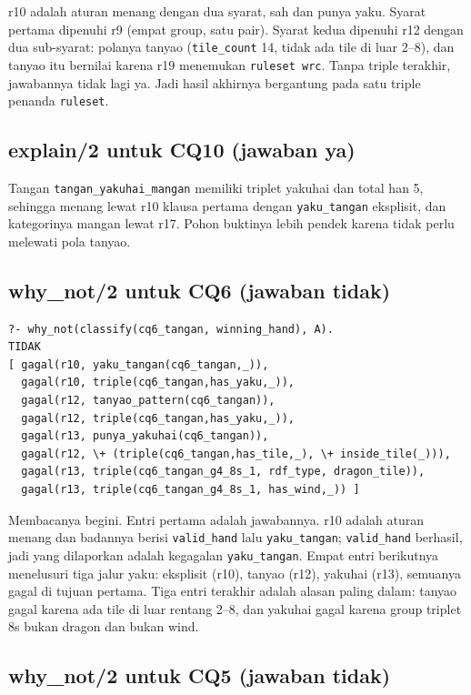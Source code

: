\documentclass[11pt,a4paper]{article}
\newcommand{\code}[1]{\texttt{#1}}
\begin{document}
r10 adalah aturan menang dengan dua syarat, sah dan punya yaku.
Syarat pertama dipenuhi r9 (empat group, satu pair). Syarat kedua dipenuhi r12 dengan
dua sub-syarat: polanya tanyao (\code{tile_count} 14, tidak ada tile di luar 2--8), dan
tanyao itu bernilai karena r19 menemukan \code{ruleset wrc}. Tanpa triple terakhir,
jawabannya tidak lagi ya. Jadi hasil akhirnya bergantung pada satu triple penanda \code{ruleset}.

\subsection{explain/2 untuk CQ10 (jawaban ya)}

Tangan \code{tangan_yakuhai_mangan} memiliki triplet yakuhai dan total han 5, sehingga
menang lewat r10 klausa pertama dengan \code{yaku_tangan} eksplisit, dan kategorinya mangan
lewat r17. Pohon buktinya lebih pendek karena tidak perlu melewati pola tanyao.

\subsection{why_not/2 untuk CQ6 (jawaban tidak)}

\begin{lstlisting}
?- why_not(classify(cq6_tangan, winning_hand), A).
TIDAK
[ gagal(r10, yaku_tangan(cq6_tangan,_)),
  gagal(r10, triple(cq6_tangan,has_yaku,_)),
  gagal(r12, tanyao_pattern(cq6_tangan)),
  gagal(r12, triple(cq6_tangan,has_yaku,_)),
  gagal(r13, punya_yakuhai(cq6_tangan)),
  gagal(r12, \+ (triple(cq6_tangan,has_tile,_), \+ inside_tile(_))),
  gagal(r13, triple(cq6_tangan_g4_8s_1, rdf_type, dragon_tile)),
  gagal(r13, triple(cq6_tangan_g4_8s_1, has_wind,_)) ]
\end{lstlisting}

Membacanya begini. Entri pertama adalah jawabannya. r10 adalah aturan menang dan badannya
berisi \code{valid_hand} lalu \code{yaku_tangan}; \code{valid\_hand} berhasil, jadi yang
dilaporkan adalah kegagalan \code{yaku\_tangan}. Empat entri berikutnya menelusuri tiga
jalur yaku: eksplisit (r10), tanyao (r12), yakuhai (r13), semuanya gagal di tujuan pertama.
Tiga entri terakhir adalah alasan paling dalam: tanyao gagal karena ada tile di luar
rentang 2--8, dan yakuhai gagal karena group triplet 8s bukan dragon dan bukan wind.

\subsection{why_not/2 untuk CQ5 (jawaban tidak)}
\end{document}
